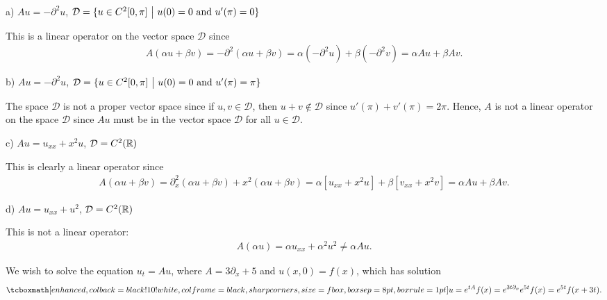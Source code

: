 \def\duedate{10/14/22}
\def\HWnum{6}



    

a) $\displaystyle Au = -\partial^2u$, $\mathcal{D} = \{ u \in C^2[0,\pi] ~\big|~ u(0) = 0 ~{\rm and}~ u'(\pi)=0 \}$

This is a linear operator on the vector space $\mathcal{D}$ since
\begin{eqnarray}
    \label{eq:lin-op-a}
    A(\alpha u + \beta v) = -\partial^2 (\alpha u + \beta v) = \alpha(-\partial^2 u) + \beta (-\partial^2 v) = \alpha Au + \beta Av
.\end{eqnarray}

b) $\displaystyle Au = -\partial^2u$, $\mathcal{D} = \{ u \in C^2[0,\pi] ~\big|~ u(0) = 0 ~{\rm and}~ u'(\pi)=\pi \}$

The space $\mathcal{D}$ is not a proper vector space since if $u,v \in \mathcal{D}$, then $u + v \not\in \mathcal{D}$ since $u'(\pi) + v'(\pi) = 2\pi$.
Hence, $A$ is not a linear operator on the space $\mathcal{D}$ since $Au$ must be in the vector space $\mathcal{D}$ for all $u \in \mathcal{D}$.

c) $\displaystyle Au = u_{xx} + x^2u$, $\mathcal{D} = C^2(\mathbb{R})$ 

This is clearly a linear operator since
\begin{eqnarray}
    \label{eq:lin-op-c}
    A(\alpha u + \beta v) = \partial_{x}^2(\alpha u + \beta v) + x^2(\alpha u + \beta v) = \alpha[u_{xx} + x^2u] + \beta[v_{xx} + x^2v] = \alpha Au + \beta Av
.\end{eqnarray}

d) $Au = u_{xx} + u^2$, $\mathcal{D} = C^2(\mathbb{R})$ 

This is not a linear operator:
\begin{eqnarray}
    \label{eq:lin-op-d}
    A(\alpha u) = \alpha u_{xx} + \alpha^2 u^2 \ne \alpha Au
.\end{eqnarray}



We wish to solve the equation $u_{t} = Au$, where $A = 3\partial_{x} + 5$ and $u(x,0) = f(x)$, which has solution 
\begin{eqnarray}
    \label{eq:solve-t-eq}
    \eqbox{
    u = e^{tA} f(x) = e^{3t\partial_{x}}e^{5t} f(x) = e^{5t}f(x+3t)
}
.\end{eqnarray}



